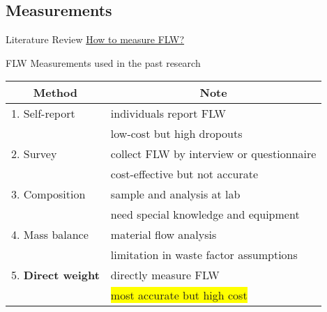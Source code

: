 \documentclass{beamer}\usepackage[]{graphicx}\usepackage[]{xcolor}
\begin{document}
\subsection{Measurements}
\begin{frame}{Literature Review}
    \underline{How to measure FLW?}
    \begin{block}{FLW Measurements used in the past research}
    \begin{table}[]
        \begin{tabular}{ll}
            \hline
            \multicolumn{1}{c}{Method} & \multicolumn{1}{c}{Note}            \\ \hline
                1. Self-report   & individuals report FLW                    \\
                                 & low-cost but high dropouts                \\
                2. Survey        & collect FLW by interview or questionnaire \\
                                 & cost-effective but not accurate           \\
                3. Composition   & sample and analysis at lab                \\
                                 & need special knowledge and equipment      \\
                4. Mass balance  & material flow analysis                    \\
                                 & limitation in waste factor assumptions    \\
                5. \textbf{Direct weight} 
                                 & directly measure FLW                      \\
                                 & \colorbox{yellow}{most accurate but high cost}          \\ \hline
        \end{tabular}
    \end{table}
    \end{block}
\end{frame}

\end{document}
